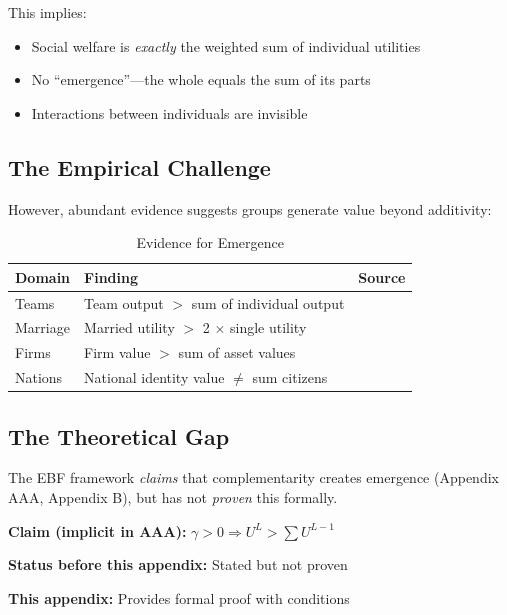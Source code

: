 This implies:
\begin{itemize}
\item Social welfare is \textit{exactly} the weighted sum of individual utilities
\item No ``emergence''---the whole equals the sum of its parts
\item Interactions between individuals are invisible
\end{itemize}

\subsection{The Empirical Challenge}

However, abundant evidence suggests groups generate value beyond additivity:

\begin{table}[htbp]
\centering
\caption{Evidence for Emergence}
\label{tab:emergence-evidence}
\renewcommand{\arraystretch}{1.3}
\begin{tabular}{@{}lll@{}}
\toprule
\textbf{Domain} & \textbf{Finding} & \textbf{Source} \\
\midrule
Teams & Team output $>$ sum of individual output & \citet{woolley2010} \\
Marriage & Married utility $>$ 2 $\times$ single utility & \citet{stutzer2006} \\
Firms & Firm value $>$ sum of asset values & \citet{milgromroberts1995} \\
Nations & National identity value $\neq$ sum citizens & \citet{akerlof2000} \\
\bottomrule
\end{tabular}
\end{table}

\subsection{The Theoretical Gap}

The EBF framework \textit{claims} that complementarity creates emergence
(Appendix AAA, Appendix B), but has not \textit{proven} this formally.

\begin{tcolorbox}[colback=red!5!white, colframe=red!75!black,
    title=The Gap We Fill]
\textbf{Claim (implicit in AAA):} $\gamma > 0 \Rightarrow U^L > \sum U^{L-1}$

\textbf{Status before this appendix:} Stated but not proven

\textbf{This appendix:} Provides formal proof with conditions
\end{tcolorbox}


